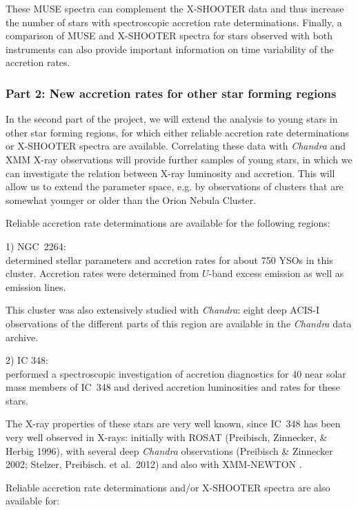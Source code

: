 \documentclass[10pt,fleqn,twoside]{article}
\newcommand{\Tcol}{\color{blue}}
\begin{document}
These MUSE spectra can complement the X-SHOOTER data and thus increase 
the number of stars with spectroscopic accretion rate determinations.
Finally, a comparison of MUSE and X-SHOOTER spectra for stars observed
with both instruments can also provide important information 
on time variability of the accretion rates.



\subsubsection*{\Tcol Part 2: New accretion rates for other star forming regions}

In the second part of the project, we will extend the analysis to young stars in other
star forming regions, for which either reliable accretion rate determinations
or X-SHOOTER spectra are available.
Correlating these data with \textit{Chandra} and XMM X-ray 
observations will provide
further samples of young stars, in which we can investigate the
relation between X-ray luminosity and accretion.
%
This will allow us to extend the parameter space, e.g. by observations
of clusters that are somewhat younger or older than the Orion Nebula Cluster.

Reliable accretion rate determinations are available for the
following regions:
\medskip


{1) NGC~2264:}\\
\citet{Venuti14} determined stellar parameters and accretion rates for about 
750 YSOs in this cluster. Accretion rates were determined from $U$-band excess emission
as well as emission lines. 

This cluster was also extensively studied with \textit{Chandra}: eight deep ACIS-I
observations of the different parts of this region are available in the 
\textit{Chandra} data archive.
\medskip

2) IC 348:\\
\citet{Dahm08} performed a spectroscopic investigation of accretion
diagnostics for 40 near solar mass members of IC~348
and derived accretion luminosities and rates for these stars.

The X-ray properties of these stars are very well known, since IC~348
has been very well observed in X-rays: initially with
ROSAT (Preibisch, Zinnecker, \& Herbig 1996), with
several deep \textit{Chandra} observations (Preibisch \& Zinnecker 2002;
Stelzer, Preibisch. et al.~2012) and also with XMM-NEWTON \citep{PZ04}.
\medskip

Reliable accretion rate determinations and/or X-SHOOTER spectra are also
available for:\smallskip
\end{document}
